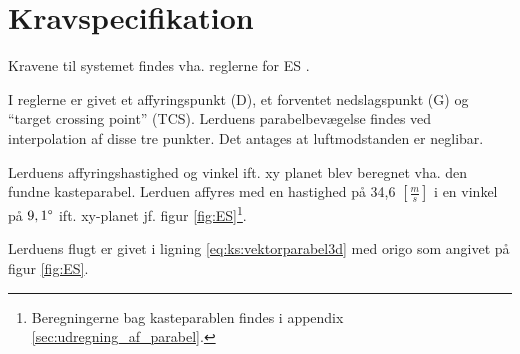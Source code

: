 \section{Kravspecifikation}
\label{sec:kravspecifikation}
Kravene til systemet findes vha. reglerne for ES \citep{ES_regler}.


I reglerne er givet et affyringspunkt (D), et forventet nedslagspunkt (G) og ``target crossing point'' (TCS).
Lerduens parabelbevægelse findes ved interpolation af disse tre punkter. Det antages at luftmodstanden er neglibar.

%
Lerduens affyringshastighed og vinkel ift. xy planet blev beregnet vha. den fundne kasteparabel. 
Lerduen affyres med en hastighed på 34,6 \([\frac{m}{s}]\) i en vinkel på \(9,1 \degree\) 
ift. xy-planet jf. figur \ref{fig:ES}\footnote{Beregningerne bag kasteparablen findes i appendix \ref{sec:udregning_af_parabel}.}. 

Lerduens flugt er givet i ligning \ref{eq:ks:vektorparabel3d} med origo som angivet på figur \ref{fig:ES}. 

